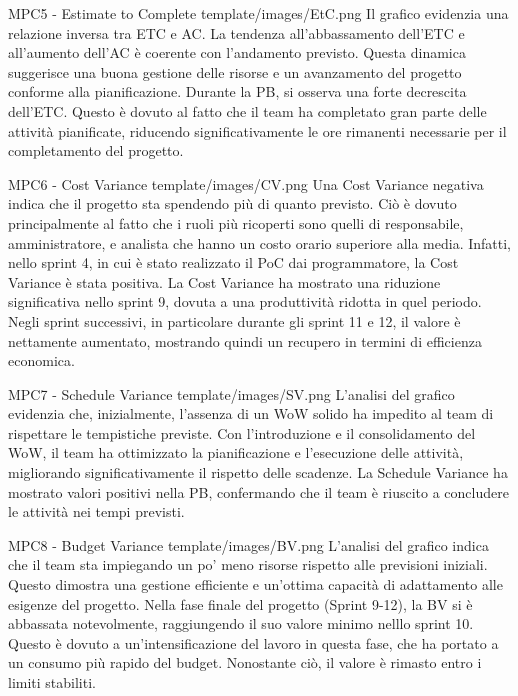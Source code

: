 \Met
{ %
    MPC5 - Estimate to Complete
}
{ %
    template/images/EtC.png
}
{ %
    Il grafico evidenzia una relazione inversa tra ETC e AC.
    La tendenza all'abbassamento dell'ETC e all'aumento dell'AC è coerente con l'andamento previsto. 
    Questa dinamica suggerisce una buona gestione delle risorse e un avanzamento del progetto conforme alla pianificazione.
}
{ %
    Durante la PB, si osserva una forte decrescita dell'ETC. Questo è dovuto al fatto che il team ha completato gran parte delle attività pianificate, riducendo significativamente le ore rimanenti necessarie per il completamento del progetto.
}


\Met
{ %
    MPC6 - Cost Variance
}
{ %
    template/images/CV.png
}
{ %
    Una Cost Variance negativa indica che il progetto sta spendendo più di quanto previsto. 
    Ciò è dovuto principalmente al fatto che i ruoli più ricoperti sono quelli di responsabile, 
    amministratore, e analista che hanno un costo orario superiore alla media.
    Infatti, nello sprint 4, in cui è stato realizzato il PoC dai programmatore, la Cost Variance è stata positiva.
}
{ %
    La Cost Variance ha mostrato una riduzione significativa nello sprint 9, dovuta a una produttività ridotta in quel periodo. Negli sprint successivi, in particolare durante gli sprint 11 e 12, il valore è nettamente aumentato, mostrando quindi un recupero in termini di efficienza economica.
}

\Met
{ %
    MPC7 - Schedule Variance
}
{ %
    template/images/SV.png
}
{ %
    L'analisi del grafico evidenzia che, inizialmente, l'assenza di un WoW solido ha impedito al team di rispettare le tempistiche previste. 
    Con l'introduzione e il consolidamento del WoW, il team ha ottimizzato la pianificazione e l'esecuzione delle attività, migliorando significativamente il rispetto delle scadenze.
}
{ %
    La Schedule Variance ha mostrato valori positivi nella PB, confermando che il team è riuscito a concludere le attività nei tempi previsti.
}

\Met
{ %
    MPC8 - Budget Variance
}
{ %
    template/images/BV.png
}
{ %
    L'analisi del grafico indica che il team sta impiegando un po' meno risorse rispetto alle previsioni iniziali.
    Questo dimostra una gestione efficiente e un'ottima capacità di adattamento alle esigenze del progetto.
}
{ %
    Nella fase finale del progetto (Sprint 9-12), la BV si è abbassata notevolmente, raggiungendo il suo valore minimo nelllo sprint 10. Questo è dovuto a un’intensificazione del lavoro in questa fase, che ha portato a un consumo più rapido del budget. Nonostante ciò, il valore è rimasto entro i limiti stabiliti.
}

